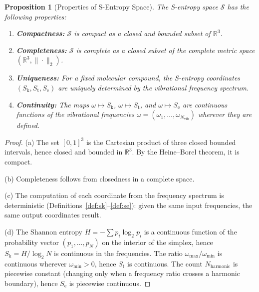 \documentclass[11pt,twocolumn,a4paper]{article}
\newtheorem{proposition}[theorem]{Proposition}
\theoremstyle{definition}
\theoremstyle{remark}
\newcommand{\Sk}{S_{\mathrm{k}}}
\newcommand{\St}{S_{\mathrm{t}}}
\newcommand{\Se}{S_{\mathrm{e}}}
\newcommand{\Sspace}{\mathcal{S}}
\newcommand{\Real}{\mathbb{R}}
\newcommand{\Nvib}{N_{\mathrm{vib}}}
\begin{document}
\begin{proposition}[Properties of S-Entropy Space]
\label{prop:sentropy-properties}
The S-entropy space $\Sspace$ has the following properties:
\begin{enumerate}[label=(\alph*)]
  \item \textbf{Compactness:} $\Sspace$ is compact as a closed and bounded subset of $\Real^3$.
  \item \textbf{Completeness:} $\Sspace$ is complete as a closed subset of the complete metric space $(\Real^3, \|\cdot\|_2)$.
  \item \textbf{Uniqueness:} For a fixed molecular compound, the S-entropy coordinates $(\Sk, \St, \Se)$ are uniquely determined by the vibrational frequency spectrum.
  \item \textbf{Continuity:} The maps $\omega \mapsto \Sk$, $\omega \mapsto \St$, and $\omega \mapsto \Se$ are continuous functions of the vibrational frequencies $\omega = (\omega_1, \ldots, \omega_{\Nvib})$ wherever they are defined.
\end{enumerate}
\end{proposition}

\begin{proof}
(a) The set $[0,1]^3$ is the Cartesian product of three closed bounded intervals, hence closed and bounded in $\Real^3$. By the Heine--Borel theorem, it is compact.

(b) Completeness follows from closedness in a complete space.

(c) The computation of each coordinate from the frequency spectrum is deterministic (Definitions~\ref{def:sk}--\ref{def:se}): given the same input frequencies, the same output coordinates result.

(d) The Shannon entropy $H = -\sum p_i \log_2 p_i$ is a continuous function of the probability vector $(p_1, \ldots, p_N)$ on the interior of the simplex, hence $\Sk = H/\log_2 N$ is continuous in the frequencies. The ratio $\omega_{\max}/\omega_{\min}$ is continuous wherever $\omega_{\min} > 0$, hence $\St$ is continuous. The count $N_{\mathrm{harmonic}}$ is piecewise constant (changing only when a frequency ratio crosses a harmonic boundary), hence $\Se$ is piecewise continuous.
\end{proof}
\end{document}
